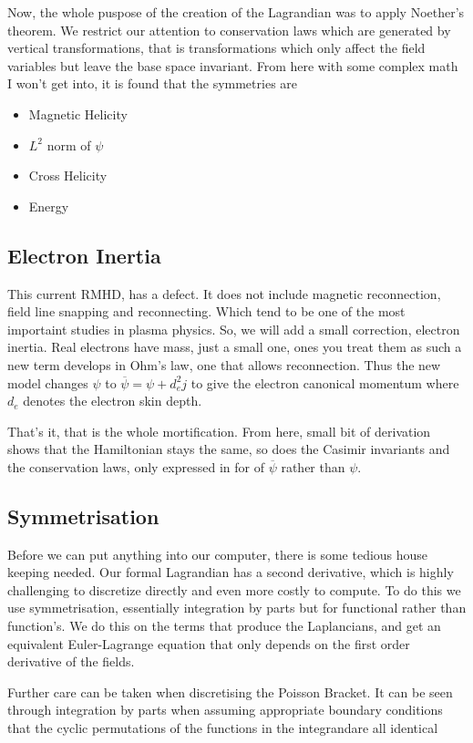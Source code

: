 Now, the whole puspose of the creation of the Lagrandian was to apply Noether's theorem. We restrict our attention to conservation laws which are generated by vertical
transformations, that is transformations which only affect the field variables but leave the base space invariant. From here with some complex math I won't get into, it is found that the symmetries are
\begin{itemize}
	\item Magnetic Helicity
	\item $L^2$ norm of $\psi$
	\item Cross Helicity
	\item Energy
\end{itemize}

\subsection{Electron Inertia}
This current RMHD, has a defect. It does not include magnetic reconnection, field line snapping and reconnecting. Which tend to be one of the most importaint studies in plasma physics. So, we will add a small correction, electron inertia. Real electrons have mass, just a small one, ones you treat them as such a new term develops in Ohm's law, one that allows reconnection.
Thus the new model changes $\psi$ to $\overline{\psi}= \psi+d^2_e j$ to give the electron canonical momentum where $d_e$ denotes the electron skin depth.

That's it, that is the whole mortification. From here, small bit of derivation shows that the Hamiltonian stays the same, so does the Casimir invariants and the conservation laws, only expressed in for of $\overline{\psi}$ rather than $\psi$.

\subsection{Symmetrisation}

Before we can put anything into our computer, there is some tedious house keeping needed. Our formal Lagrandian has a second derivative, which is highly challenging to discretize directly and even more costly to compute. To do this we use symmetrisation, essentially integration by parts but for functional rather than function's. We do this on the terms that produce the Laplancians, and get an equivalent Euler-Lagrange equation that only depends on the first order derivative of the fields.


Further care can be taken when discretising the Poisson Bracket. It can be seen through integration by parts when assuming appropriate boundary conditions that the cyclic permutations of the functions in the integrandare all identical

